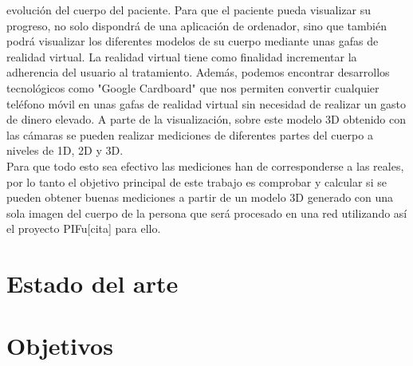 	evolución del cuerpo del paciente. Para que el paciente pueda visualizar su progreso, no solo dispondrá de una aplicación de ordenador, sino que también podrá visualizar los
	diferentes modelos de su cuerpo mediante unas gafas de realidad virtual. La realidad virtual tiene como finalidad incrementar la adherencia del usuario al tratamiento. Además, podemos encontrar desarrollos tecnológicos como "Google Cardboard" que nos permiten convertir cualquier teléfono móvil en unas gafas de realidad virtual sin necesidad de realizar un gasto de dinero elevado. A parte de la visualización, sobre este modelo 3D obtenido con las cámaras se pueden realizar mediciones de diferentes partes del cuerpo a niveles de 1D, 2D y 3D.
\\

Para que todo esto sea efectivo las mediciones han de corresponderse a las reales, por lo tanto el objetivo principal de este trabajo es comprobar y calcular si se pueden obtener buenas mediciones a partir de un modelo 3D generado con una sola imagen del cuerpo de la persona que será procesado en una red utilizando así el proyecto PIFu[cita] para ello.



\section{Estado del arte}



%





\section{Objetivos}




